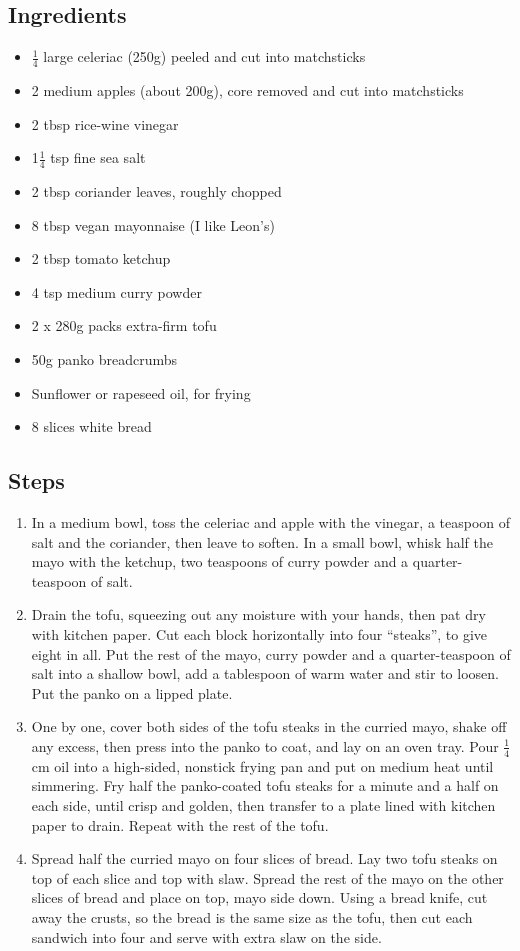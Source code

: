 \documentclass{book}
\begin{document}
\subsection*{Ingredients}
\begin{itemize}
\item $\frac{1}{4}$ large celeriac (250g) peeled and cut into matchsticks
\item 2 medium apples (about 200g), core removed and cut into matchsticks
\item 2 tbsp rice-wine vinegar
\item 1$\frac{1}{4}$ tsp fine sea salt
\item 2 tbsp coriander leaves, roughly chopped
\item 8 tbsp vegan mayonnaise (I like Leon’s) 
\item 2 tbsp tomato ketchup 
\item 4 tsp medium curry powder 
\item 2 x 280g packs extra-firm tofu
\item 50g panko breadcrumbs 
\item Sunflower or rapeseed oil, for frying 
\item 8 slices white bread
\end{itemize}

\subsection*{Steps}
\begin{enumerate}
\item In a medium bowl, toss the celeriac and apple with the vinegar, a teaspoon of salt and the coriander, then leave to soften. In a small bowl, whisk half the mayo with the ketchup, two teaspoons of curry powder and a quarter-teaspoon of salt. 
\item Drain the tofu, squeezing out any moisture with your hands, then pat dry with kitchen paper. Cut each block horizontally into four “steaks”, to give eight in all. Put the rest of the mayo, curry powder and a quarter-teaspoon of salt into a shallow bowl, add a tablespoon of warm water and stir to loosen. Put the panko on a lipped plate.
\item One by one, cover both sides of the tofu steaks in the curried mayo, shake off any excess, then press into the panko to coat, and lay on an oven tray. Pour $\frac{1}{4}$cm oil into a high-sided, nonstick frying pan and put on medium heat until simmering. Fry half the panko-coated tofu steaks for a minute and a half on each side, until crisp and golden, then transfer to a plate lined with kitchen paper to drain. Repeat with the rest of the tofu.
\item Spread half the curried mayo on four slices of bread. Lay two tofu steaks on top of each slice and top with slaw. Spread the rest of the mayo on the other slices of bread and place on top, mayo side down. Using a bread knife, cut away the crusts, so the bread is the same size as the tofu, then cut each sandwich into four and serve with extra slaw on the side.
\end{enumerate}
\newpage
\end{document}
